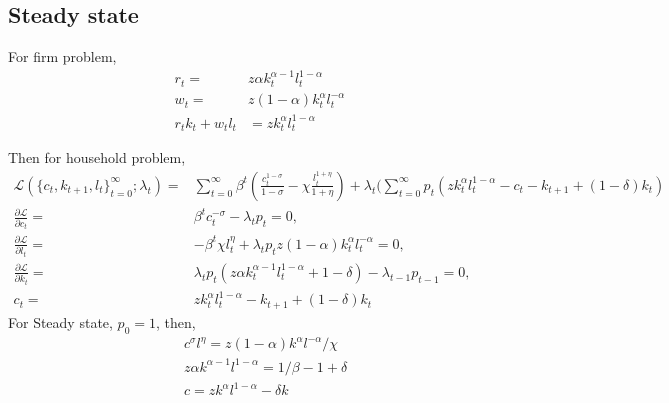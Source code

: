 \documentclass[]{article}
\begin{document}
        \subsection{Steady state}
            For firm problem,
            \begin{equation}
            \begin{split}
                r_t =&z\alpha k_t^{\alpha -1}l_t^{1-\alpha}\\
                w_t =&z(1-\alpha) k_t^{\alpha}l_t^{-\alpha}\\
                r_tk_t+w_tl_t&=zk_t^{\alpha}l_t^{1-\alpha}
            \end{split}
            \end{equation}
            
            Then for household problem,
            \begin{equation}
            \begin{split}
                \mathcal{L}(\{c_t,k_{t+1},l_t\}_{t=0}^{\infty};\lambda_t)=&\sum_{t=0}^{\infty}
                \beta ^t(\frac{c_t^{1-\sigma}}{1-\sigma}-\chi \frac{l_t^{1+\eta}}{1+\eta})+\lambda_t(\sum_{t=0}^{\infty}p_t(zk_t^{\alpha}l_t^{1-\alpha}-c_t-k_{t+1}+(1-\delta)k_t)\\
                \frac{\partial \mathcal{L}}{\partial c_t}=&\beta^tc_t^{-\sigma}-\lambda_t p_t=0,\\
                \frac{\partial \mathcal{L}}{\partial l_t}=&-\beta^t\chi l_t^{\eta}+\lambda_t p_tz(1-\alpha) k_t^{\alpha}l_t^{-\alpha}=0,\\
                \frac{\partial \mathcal{L}}{\partial k_t}=&\lambda_t p_t(z\alpha k_t^{\alpha -1}l_t^{1-\alpha}+1-\delta)-\lambda_{t-1}p_{t-1}=0,\\
                c_t=&zk_t^{\alpha}l_t^{1-\alpha}-k_{t+1}+(1-\delta)k_t
            \end{split}
            \end{equation}
            For Steady state, $p_0=1$,
            then, 
            \begin{equation}\label{ssfoc}
            \begin{split}
                &c^{\sigma} l^{\eta}=
                z(1-\alpha)k^{\alpha}l^{-\alpha}/\chi\\
                &z\alpha k^{\alpha -1}l^{1-\alpha}=
                1/\beta -1 +\delta\\
                &c=zk^{\alpha}l^{1-\alpha}-\delta k
            \end{split}
            \end{equation}  
\end{document}
